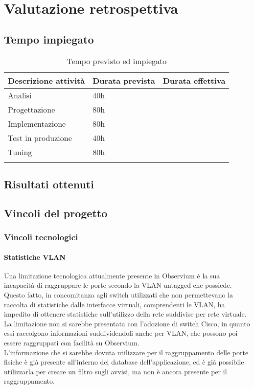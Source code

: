 \documentclass[Tesi.tex]{subfiles}
\begin{document}
\chapter{Valutazione retrospettiva}

\section{Tempo impiegato}

\label{table:Tempo previsto ed impiegato}
\renewcommand*{\arraystretch}{1.2}
\begin{longtable}[H]{p{6cm}p{3.5cm}p{3.5cm}}
	\rowcolor{CHeader}
	\color{CHeaderText} \textbf{Descrizione attivit\`{a}} & \color{CHeaderText} \textbf{Durata prevista} & \color{CHeaderText} \textbf{Durata effettiva} \\
	\endhead
		Analisi & 40h & \\
		Progettazione & 80h & \\
		Implementazione & 80h & \\
		Test in produzione & 40h & \\
		Tuning & 80h & \\
	\hiderowcolors
	\caption{Tempo previsto ed impiegato}
\end{longtable}

\section{Risultati ottenuti}

\section{Vincoli del progetto}
\subsection{Vincoli tecnologici}
\subsubsection{Statistiche VLAN}
Una limitazione tecnologica attualmente presente in Observium è la sua incapacità di raggruppare le porte secondo la VLAN untagged che possiede. \\
Questo fatto, in concomitanza agli switch utilizzati che non permettevano la raccolta di statistiche dalle interfacce virtuali, comprendenti le VLAN, ha impedito di ottenere statistiche sull'utilizzo della rete suddivise per rete virtuale. \\
La limitazione non si sarebbe presentata con l'adozione di switch Cisco, in quanto essi raccolgono informazioni suddividendoli anche per VLAN, che possono poi essere raggruppati con facilità su Observium. \\
L'informazione che si sarebbe dovuta utilizzare per il raggruppamento delle porte fisiche è già presente all'interno del database dell'applicazione, ed è già possibile utilizzarla per creare un filtro sugli avvisi, ma non è ancora presente per il raggruppamento.
\end{document}
